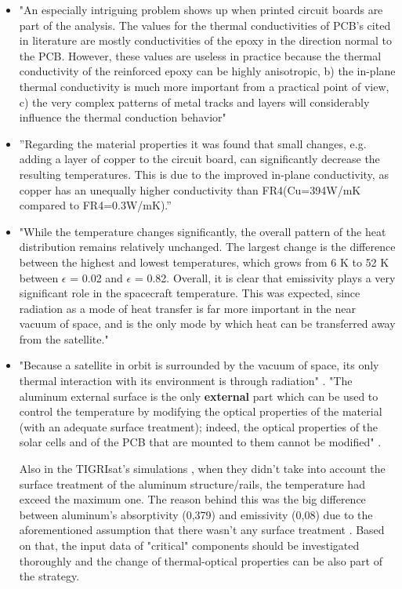 \documentclass[final]{cubedoc}
\begin{document}
	\begin{itemize}
		\item "An especially intriguing problem shows up when printed circuit boards are part of the analysis. The values for the thermal conductivities of PCB’s cited in literature are mostly conductivities of the epoxy in the direction normal to the PCB. However, these values are useless in practice because the thermal conductivity of the reinforced epoxy can be highly anisotropic, b) the in-plane thermal conductivity is much more important from a practical point of view, c) the very complex patterns of metal tracks and layers will considerably influence the thermal conduction behavior" \cite{lasance2002}
		\item ”Regarding the material properties it was found that small changes, e.g.  adding a layer of copper to the circuit board, can significantly decrease the resulting temperatures.  This is due to the improved in-plane conductivity, as copper has an unequally higher conductivity than FR4(Cu=394W/mK compared to FR4=0.3W/mK).” \cite{reiss2012} 
		\item "While the temperature changes significantly, the overall pattern of the heat distribution remains relatively unchanged. The largest change is the difference between the highest and lowest temperatures, which grows from 6 K to 52 K between $\epsilon$ = 0.02 and $\epsilon$ = 0.82. Overall, it is clear that emissivity plays a very significant role in the spacecraft temperature. This was expected, since radiation as a mode of heat transfer is far more important in the near vacuum of space, and is the only mode by which heat can be transferred away from the satellite." \cite{peake2014cubesat}
		\item "Because a satellite in orbit is surrounded by the vacuum of space, its only
		thermal interaction with its environment is through radiation" \cite{vanoutryve2008}.
		"The aluminum external surface is the only \textbf{external} part which can be used to control the temperature by modifying the optical properties of the material (with an adequate surface treatment); indeed, the optical properties of the solar cells and of the PCB that are mounted to them cannot be modified" \cite{paris2015}.
		
		Also in the TIGRIsat's simulations , when they didn't take into account the surface treatment of the aluminum structure/rails, the temperature had exceed the maximum one. The reason behind this was the big difference between aluminum's absorptivity (0,379) and emissivity (0,08) due to the aforementioned assumption that there wasn't any surface treatment \cite{paris2015}. Based on that, the input data of "critical" components should be investigated thoroughly and the change of thermal-optical properties can be also part of the strategy.
	\end{itemize}
	
\end{document}
